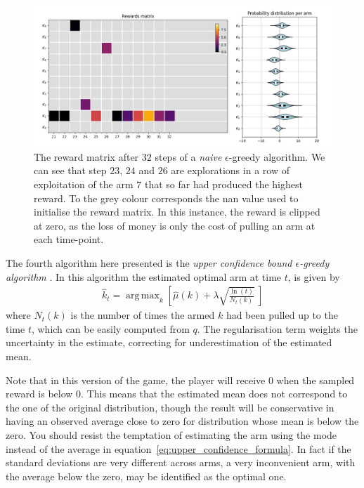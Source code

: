 \documentclass[]{scrartcl}
\DeclareMathOperator*{\argmax}{arg\,max}
\theoremstyle{definition}
\begin{document}
\begin{figure}[h]
    \hspace{-1cm}
    \includegraphics[width=17cm]{figures/step_32.jpg}
    \caption{The reward matrix after $32$ steps of a \emph{naive} $\epsilon$-greedy algorithm. We can see that step $23$, $24$ and $26$ are explorations in a row of exploitation of the arm $7$ that so far had produced the highest reward. To the grey colour corresponds the nan value used to initialise the reward matrix. In this instance, the reward is clipped at zero, as the loss of money is only the cost of pulling an arm at each time-point.}
    \label{fig:step_32}
\end{figure}

The fourth algorithm here presented is the \emph{upper confidence bound $\epsilon$-greedy algorithm} \cite{sutton2018reinforcement}. In this algorithm the estimated optimal arm at time $t$, is given by
\begin{align}\label{eq:upper_confidence_formula}
\hat{k}_t = \argmax_{k} \left[ \hat{\mu}(k) + \lambda \sqrt{ \frac{\ln(t)}{ N_{t}(k) }  } ~\right]
\end{align}
where $N_{t}(k)$ is the number of times the armed $k$ had been pulled up to the time $t$, which can be easily computed from $q$. The regularisation term weights the uncertainty in the estimate, correcting for underestimation of the estimated mean.

Note that in this version of the game, the player will receive $0$ when the sampled reward is below $0$. This means that the estimated mean does not correspond to the one of the original distribution, though the result will be conservative in having an observed average close to zero for distribution whose mean is below the zero. You should resist the temptation of estimating the arm using the mode instead of the average in equation~\ref{eq:upper_confidence_formula}. In fact if the standard deviations are very different across arms, a very inconvenient arm, with the average below the zero, may be identified as the optimal one.
\end{document}
